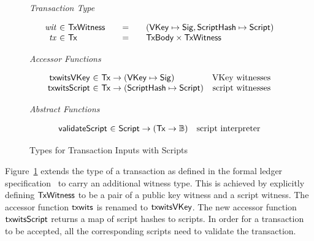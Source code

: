 \documentclass[11pt,a4paper,dvipsnames,twosided]{article}
\newcommand{\khcomment}[1]{\todo[color=blue!20]{KH: #1}}
\newcommand{\Bool}{\ensuremath{\mathbb{B}}}
\newcommand{\Tx}{\type{Tx}}
\newcommand{\TxWitness}{\type{TxWitness}}
\newcommand{\TxBody}{\type{TxBody}}
\newcommand{\HashScr}{\type{ScriptHash}}
\newcommand{\Script}{\type{Script}}
\newcommand{\VKey}{\type{VKey}}
\newcommand{\Sig}{\type{Sig}}
\theoremstyle{definition}
\begin{document}
\begin{figure}[hbt]
  \emph{Transaction Type}

  \begin{equation*}
    \begin{array}{r@{~\in~}l@{\qquad=\qquad}l}
      \var{wit} & \TxWitness & (\VKey \mapsto \Sig, \HashScr \mapsto \Script)
      \\
      \var{tx}
      & \Tx
      & \TxBody \times \TxWitness
      \\
    \end{array}
  \end{equation*}

  \emph{Accessor Functions}

  \begin{equation*}
    \begin{array}{r@{~\in~}lr}
      \fun{txwitsVKey} & \Tx \to (\VKey \mapsto \Sig) & \text{VKey witnesses} \\
      \fun{txwitsScript} & \Tx \to (\HashScr \mapsto \Script) & \text{script witnesses}
    \end{array}
  \end{equation*}

  \emph{Abstract Functions}

  \begin{equation*}
    \begin{array}{r@{~\in~}lr}
      \fun{validateScript} & \Script \to (\Tx \to \Bool) & \text{script interpreter}
    \end{array}
  \end{equation*}
  \caption{Types for Transaction Inputs with Scripts}
  \label{fig:types_defs_multi}
\end{figure}

Figure~\ref{fig:types_defs_multi} extends the type of a transaction as defined
in the formal ledger specification~\cite{shelley_spec} to carry an additional
witness type. This is achieved by explicitly defining $\TxWitness$ to be a pair
of a public key witness and a script
witness. %
The accessor function $\mathsf{txwits}$ is renamed to $\mathsf{txwitsVKey}$. The new
accessor function $\mathsf{txwitsScript}$ returns a map of script hashes to
scripts.  In order for a transaction to be accepted, all the corresponding
scripts need to validate the transaction.
\end{document}
